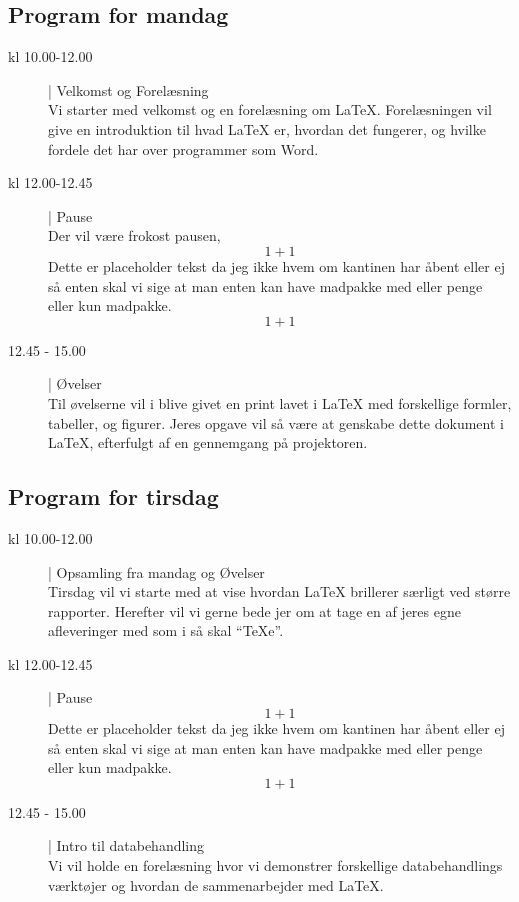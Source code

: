 \documentclass{article}                                                        %
\begin{document}
    \subsection{Program for mandag}
    \begin{description}
        \item[kl 10.00-12.00] | Velkomst og Forelæsning ~ \\
        Vi starter med velkomst og en forelæsning om LaTeX.
        Forelæsningen vil give en introduktion til hvad LaTeX er, hvordan det
        fungerer, og hvilke fordele det har over programmer som Word.

        \item[kl 12.00-12.45] | Pause ~ \\
        Der vil være frokost pausen, 
        $$ 1+ 1$$
		Dette er placeholder tekst da jeg ikke hvem om kantinen har åbent eller ej
		så enten skal vi sige at man enten kan have madpakke med eller penge
		eller kun madpakke. 
		$$1+1$$

        \item[12.45 - 15.00] | Øvelser ~ \\
        Til øvelserne vil i blive givet en print lavet i LaTeX med forskellige
        formler, tabeller, og figurer. Jeres opgave vil så være at genskabe
        dette dokument i LaTeX, efterfulgt af en gennemgang på projektoren.
    \end{description}


    \subsection{Program for tirsdag}
    \begin{description}
        \item[kl 10.00-12.00] | Opsamling fra mandag og Øvelser ~ \\
        Tirsdag vil vi starte med at vise hvordan LaTeX brillerer særligt
        ved større rapporter. Herefter vil vi gerne bede jer om at tage en af
        jeres egne afleveringer med som i så skal ``TeXe''.

        \item[kl 12.00-12.45] | Pause ~ \\
       $$ 1+ 1$$
		Dette er placeholder tekst da jeg ikke hvem om kantinen har åbent eller ej
		så enten skal vi sige at man enten kan have madpakke med eller penge
		eller kun madpakke. 
		$$1+1$$

        \item[12.45 - 15.00] | Intro til databehandling ~ \\
        Vi vil holde en forelæsning hvor vi demonstrer forskellige databehandlings
        værktøjer og hvordan de sammenarbejder med LaTeX.
    \end{description}
\end{document}
